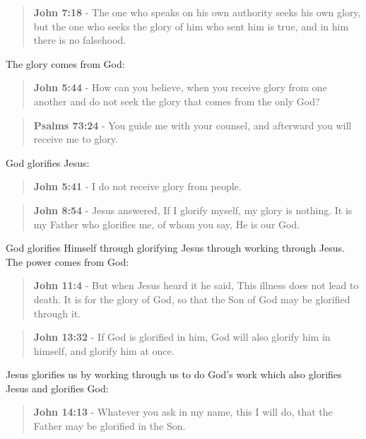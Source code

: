 \documentclass[11pt]{article}
\begin{document}
\begin{quote}
\textbf{John 7:18} - The one who speaks on his own authority seeks his own glory, but the one who seeks the glory of him who sent him is true, and in him there is no falsehood.
\end{quote}

The glory comes from God:

\begin{quote}
\textbf{John 5:44} - How can you believe, when you receive glory from one another and do not seek the glory that comes from the only God?
\end{quote}

\begin{quote}
\textbf{Psalms 73:24} - You guide me with your counsel, and afterward you will receive me to glory.
\end{quote}

God glorifies Jesus:

\begin{quote}
\textbf{John 5:41} - I do not receive glory from people.
\end{quote}

\begin{quote}
\textbf{John 8:54} - Jesus answered, If I glorify myself, my glory is nothing. It is my Father who glorifies me, of whom you say, He is our God.
\end{quote}

God glorifies Himself through glorifying Jesus through working through Jesus. The power comes from God:

\begin{quote}
\textbf{John 11:4} - But when Jesus heard it he said, This illness does not lead to death. It is for the glory of God, so that the Son of God may be glorified through it.
\end{quote}

\begin{quote}
\textbf{John 13:32} - If God is glorified in him, God will also glorify him in himself, and glorify him at once.
\end{quote}

Jesus glorifies us by working through us to do God's work which also glorifies Jesus and glorifies God:

\begin{quote}
\textbf{John 14:13} - Whatever you ask in my name, this I will do, that the Father may be glorified in the Son.
\end{quote}
\end{document}
